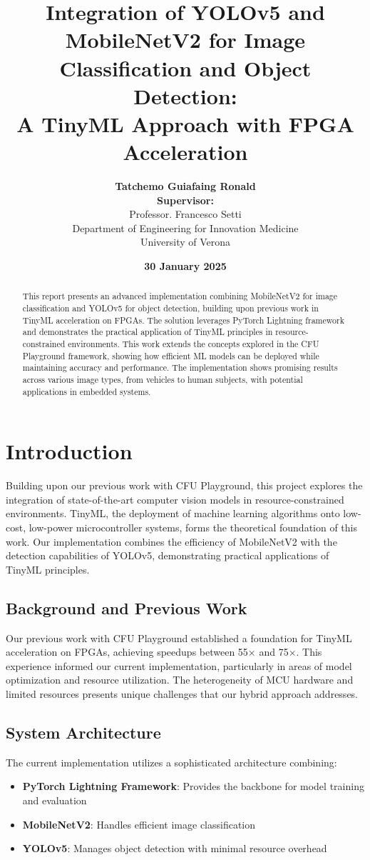 \documentclass{article}
\title{\textbf{Integration of YOLOv5 and MobileNetV2 for Image Classification and Object Detection: \\
A TinyML Approach with FPGA Acceleration}}
\author{
    \textbf{Tatchemo Guiafaing Ronald} \\
    \vspace{1cm}
    \textbf{Supervisor:} \\
    Professor. Francesco Setti \\
    Department of Engineering for Innovation Medicine \\
    University of Verona
}
\date{\textbf{30 January 2025}}
\begin{document}
\justifying

\maketitle

\begin{abstract}
This report presents an advanced implementation combining MobileNetV2 for image classification and YOLOv5 for object detection, building upon previous work in TinyML acceleration on FPGAs. The solution leverages PyTorch Lightning framework and demonstrates the practical application of TinyML principles in resource-constrained environments. This work extends the concepts explored in the CFU Playground framework, showing how efficient ML models can be deployed while maintaining accuracy and performance. The implementation shows promising results across various image types, from vehicles to human subjects, with potential applications in embedded systems.
\end{abstract}

\section{Introduction}
Building upon our previous work with CFU Playground, this project explores the integration of state-of-the-art computer vision models in resource-constrained environments. TinyML, the deployment of machine learning algorithms onto low-cost, low-power microcontroller systems, forms the theoretical foundation of this work. Our implementation combines the efficiency of MobileNetV2 with the detection capabilities of YOLOv5, demonstrating practical applications of TinyML principles.

\subsection{Background and Previous Work}
Our previous work with CFU Playground established a foundation for TinyML acceleration on FPGAs, achieving speedups between 55× and 75×. This experience informed our current implementation, particularly in areas of model optimization and resource utilization. The heterogeneity of MCU hardware and limited resources presents unique challenges that our hybrid approach addresses.

\subsection{System Architecture}
The current implementation utilizes a sophisticated architecture combining:
\begin{itemize}
    \item \textbf{PyTorch Lightning Framework}: Provides the backbone for model training and evaluation
    \item \textbf{MobileNetV2}: Handles efficient image classification
    \item \textbf{YOLOv5}: Manages object detection with minimal resource overhead
\end{itemize}
\end{document}
